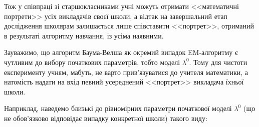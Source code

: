 \vspace{0.4cm}
Тож у співпраці зі старшокласниками учні можуть отримати <<математичні портрети>> усіх викладачів своєї школи, а відтак на завершальний етап дослідження школярам залишається лише співставити <<портрет>>, отриманий в результаті алгоритму навчання, із усіма наявними.

Зауважимо, що алгоритм Баума-Велша як окремий випадок EM-алгоритму є чутливим до вибору початкових параметрів, тобто моделі $\lambda^0$. Тому для чистоти експерименту учням, мабуть, не варто прив'язуватися до учителя математики, а натомість надати на вхід певний усереднений <<портрет>> викладача їхньої школи. 

Наприклад, наведемо близькі до рівномірних параметри початкової моделі $\lambda^0$ (що не обов'язково відповідає випадку конкретної школи) такого виду:

